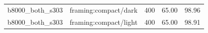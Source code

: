 \begin{longtable}{l>{\raggedright\arraybackslash}p{.42\linewidth}rrr}
b8000\_\allowbreak{}both\_\allowbreak{}s303 & %
framing:compact/dark & %
400 & %
65.00 & %
98.96 \\ %

b8000\_\allowbreak{}both\_\allowbreak{}s303 & %
framing:compact/light & %
400 & %
65.00 & %
98.91 \\ %


\end{longtable}
